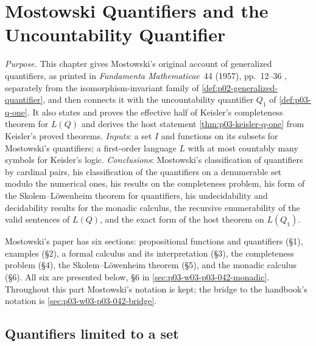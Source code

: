 \chapter{Mostowski Quantifiers and the Uncountability Quantifier}
\label{sec:p03-w03-p03-042-mostowski}

\emph{Purpose.}  This chapter gives Mostowski's original account of
generalized quantifiers, as printed in \emph{Fundamenta Mathematicae}~44
(1957), pp.~12--36 \cite{Mostowski1957}, separately from the
isomorphism-invariant family of \cref{def:p02-generalized-quantifier}, and
then connects it with the uncountability quantifier \(Q_1\) of
\cref{def:p03-q-one}.  It also states and proves the effective half of
Keisler's completeness theorem for \(L(Q)\) and derives the host statement
\cref{thm:p03-keisler-q-one} from Keisler's proved theorems.
\emph{Inputs}: a set \(I\) and functions on its subsets for Mostowski's
quantifiers; a first-order language \(L\) with at most countably many
symbols for Keisler's logic.  \emph{Conclusions}: Mostowski's
classification of quantifiers by cardinal pairs, his classification of
the quantifiers on a denumerable set modulo the numerical ones, his
results on the completeness problem, his form of the
Skolem--L\"owenheim theorem for quantifiers, his undecidability and
decidability results for the monadic calculus, the recursive
enumerability of the valid sentences of \(L(Q)\), and the exact form of the host theorem on
\(L(Q_1)\).

Mostowski's paper has six sections: propositional functions and
quantifiers (\S1), examples (\S2), a formal calculus and its
interpretation (\S3), the completeness problem (\S4), the
Skolem--L\"owenheim theorem (\S5), and the monadic calculus (\S6).
All six are presented below, \S6 in
\cref{sec:p03-w03-p03-042-monadic}.  Throughout this part Mostowski's
notation is kept; the bridge to the handbook's notation is
\cref{sec:p03-w03-p03-042-bridge}.

\section{Quantifiers limited to a set}
\label{sec:p03-w03-p03-042-limited}

